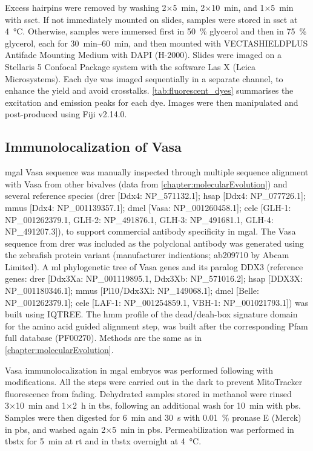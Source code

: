Excess hairpins were removed by washing 2×\qty{5}{\minute}, 2×\qty{10}{\minute}, and 1×\qty{5}{\minute} with \gls{ssct}. If not immediately mounted on slides, samples were stored in \gls{ssct} at \qty{+4}{\degreeCelsius}. Otherwise, samples were immersed first in \qty{50}{\percent} glycerol and then in \qty{75}{\percent} glycerol, each for \qtyrange{30}{60}{\minute}, and then mounted with VECTASHIELD\textregistered PLUS Antifade Mounting Medium with DAPI (H-2000). Slides were imaged on a Stellaris 5 Confocal Package system with the software Las X (Leica Microsystems). Each dye was imaged sequentially in a separate channel, to enhance the yield and avoid crosstalks. \cref{tab:fluorescent_dyes} summarises the excitation and emission peaks for each dye. Images were then manipulated and post-produced using Fiji v2.14.0.

\subsection{Immunolocalization of Vasa}
\gls{mgal} Vasa sequence was manually inspected through multiple sequence alignment with Vasa from other bivalves (data from \cref{chapter:molecularEvolution}) and several reference species (\gls{drer} [Ddx4: NP\_571132.1]; \gls{hsap} [Ddx4: NP\_077726.1]; \gls{mmus} [Ddx4: NP\_001139357.1]; \gls{dmel} [Vasa: NP\_001260458.1]; \gls{cele} [GLH-1: NP\_001262379.1, GLH-2: NP\_491876.1, GLH-3: NP\_491681.1, GLH-4: NP\_491207.3]), to support commercial antibody specificity in \gls{mgal}. The Vasa sequence from \gls{drer} was included as the polyclonal antibody was generated using the zebrafish protein variant (manufacturer indications; ab209710 by Abcam Limited). A \gls{ml} phylogenetic tree of Vasa genes and its paralog DDX3 (reference genes:  \gls{drer} [Ddx3Xa: NP\_001119895.1, Ddx3Xb: NP\_571016.2]; \gls{hsap} [DDX3X: NP\_001180346.1]; \gls{mmus} [Pl10/Ddx3Xl: NP\_149068.1]; \gls{dmel} [Belle: NP\_001262379.1]; \gls{cele} [LAF-1: NP\_001254859.1, VBH-1: NP\_001021793.1]) was built using IQTREE. The \gls{hmm} profile of the \gls{dead/deah-box} signature domain for the amino acid guided alignment step, was built after the corresponding Pfam full database (PF00270). Methods are the same as in \cref{chapter:molecularEvolution}. 

Vasa immunolocalization in \gls{mgal} embryos was performed following  with modifications. All the steps were carried out in the dark to prevent MitoTracker fluorescence from fading. Dehydrated samples stored in methanol were rinsed 3×\qty{10}{\minute} and 1×\qty{2}{\hour} in \gls{tbs}, following an additional wash for \qty{10}{\minute} with \gls{pbs}. Samples were then digested for \qty{6}{\minute} and \qty{30}{\second} with \qty{0.01}{\percent} pronase E (Merck) in \gls{pbs}, and washed again 2×\qty{5}{\minute} in \gls{pbs}. Permeabilization was performed in \gls{tbstx} \zeroonepercent for \qty{5}{\minute} at \gls{rt} and in \gls{tbstx} \onepercent overnight at \qty{4}{\degreeCelsius}.

